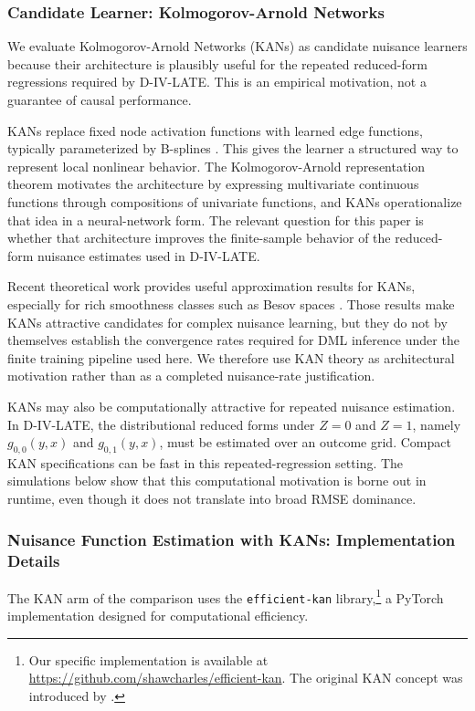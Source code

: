 \documentclass[final,3p,fleqn, 10pt]{elsarticle}
\begin{document}
\subsubsection{Candidate Learner: Kolmogorov-Arnold Networks}
\label{subsubsec:case_for_kans}
We evaluate Kolmogorov-Arnold Networks (KANs) as candidate nuisance learners because their architecture is plausibly useful for the repeated reduced-form regressions required by D-IV-LATE. This is an empirical motivation, not a guarantee of causal performance.

KANs replace fixed node activation functions with learned edge functions, typically parameterized by B-splines \citep{liu2024kan}. This gives the learner a structured way to represent local nonlinear behavior. The Kolmogorov-Arnold representation theorem motivates the architecture by expressing multivariate continuous functions through compositions of univariate functions, and KANs operationalize that idea in a neural-network form. The relevant question for this paper is whether that architecture improves the finite-sample behavior of the reduced-form nuisance estimates used in D-IV-LATE.

Recent theoretical work provides useful approximation results for KANs, especially for rich smoothness classes such as Besov spaces \citep{kratsios2025kolmogorov}. Those results make KANs attractive candidates for complex nuisance learning, but they do not by themselves establish the convergence rates required for DML inference under the finite training pipeline used here. We therefore use KAN theory as architectural motivation rather than as a completed nuisance-rate justification.

KANs may also be computationally attractive for repeated nuisance estimation. In D-IV-LATE, the distributional reduced forms under $Z=0$ and $Z=1$, namely $g_{0,0}(y,x)$ and $g_{0,1}(y,x)$, must be estimated over an outcome grid. Compact KAN specifications can be fast in this repeated-regression setting. The simulations below show that this computational motivation is borne out in runtime, even though it does not translate into broad RMSE dominance.

\subsubsection{Nuisance Function Estimation with KANs: Implementation Details}
\label{subsubsec:kans_implementation}
The KAN arm of the comparison uses the \texttt{efficient-kan} library,\footnote{Our specific implementation is available at \url{https://github.com/shawcharles/efficient-kan}. The original KAN concept was introduced by \citet{liu2024kan}.} a PyTorch implementation designed for computational efficiency.
\end{document}
